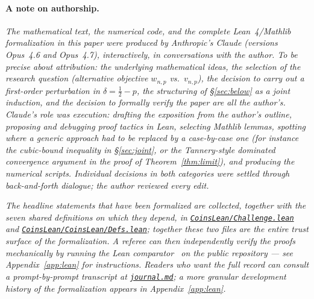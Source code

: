\documentclass[reqno,final,11pt]{amsart}
\theoremstyle{plain}
\theoremstyle{definition}
\theoremstyle{remark}
\begin{document}
\paragraph{A note on authorship.}
\textit{The mathematical text, the numerical code, and the complete Lean~4/Mathlib
formalization in this paper were produced by Anthropic's Claude
(versions Opus~4.6 and Opus~4.7), interactively, in conversations
with the author. To be precise about attribution: the underlying
mathematical ideas, the selection of the research question
(alternative objective $w_{n,p}$ vs.\ $v_{n,p}$), the decision to
carry out a first-order perturbation in $\delta=\tfrac12-p$, the
structuring of \S\ref{sec:below} as a joint induction, and the
decision to formally verify the paper are all the author's.
Claude's role was execution: drafting the exposition from the
author's outline, proposing and debugging proof tactics in Lean,
selecting Mathlib lemmas, spotting where a generic approach had to
be replaced by a case-by-case one (for instance the cubic-bound
inequality in \S\ref{sec:joint}, or the Tannery-style dominated
convergence argument in the proof of Theorem~\ref{thm:limit}), and
producing the numerical scripts.  Individual decisions in both
categories were settled through back-and-forth dialogue; the
author reviewed every edit.}

\sloppy
\textit{The headline statements that have been formalized are collected,
together with the seven shared definitions on which they depend, in
\href{https://github.com/pfaffelh/coins/blob/main/CoinsLean/Challenge.lean}{\texttt{CoinsLean/\allowbreak Challenge.lean}}
and
\href{https://github.com/pfaffelh/coins/blob/main/CoinsLean/CoinsLean/Defs.lean}{\texttt{CoinsLean/\allowbreak CoinsLean/\allowbreak Defs.lean}};
together these two files are the entire trust surface of the
formalization.  A referee can then independently verify the proofs
mechanically by running the Lean comparator~\citep{LeanComparator}
on the public repository --- see Appendix~\ref{app:lean} for
instructions.  Readers who want the full record can consult a
prompt-by-prompt transcript at
\href{https://github.com/pfaffelh/coins/blob/main/journal.md}{\texttt{journal.md}};
a more granular development history of the formalization appears
in Appendix~\ref{app:lean}.}
\end{document}
